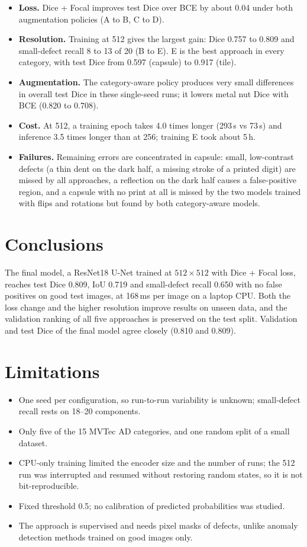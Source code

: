 \documentclass[10pt,a4paper]{article}
\begin{document}
\begin{itemize}
  \item \textbf{Loss.} Dice + Focal improves test Dice over BCE by about 0.04 under both augmentation policies (A to B, C to D).
  \item \textbf{Resolution.} Training at 512 gives the largest gain: Dice 0.757 to 0.809 and small-defect recall 8 to 13 of 20 (B to E). E is the best approach in every category, with test Dice from 0.597 (capsule) to 0.917 (tile).
  \item \textbf{Augmentation.} The category-aware policy produces very small differences in overall test Dice in these single-seed runs; it lowers metal nut Dice with BCE (0.820 to 0.708).
  \item \textbf{Cost.} At 512, a training epoch takes 4.0 times longer (293\,s vs 73\,s) and inference 3.5 times longer than at 256; training E took about 5\,h.
  \item \textbf{Failures.} Remaining errors are concentrated in capsule: small, low-contrast defects (a thin dent on the dark half, a missing stroke of a printed digit) are missed by all approaches, a reflection on the dark half causes a false-positive region, and a capsule with no print at all is missed by the two models trained with flips and rotations but found by both category-aware models.
\end{itemize}

\section{Conclusions}

The final model, a ResNet18 U-Net trained at $512\times512$ with Dice + Focal loss, reaches test Dice 0.809, IoU 0.719 and small-defect recall 0.650 with no false positives on good test images, at 168\,ms per image on a laptop CPU. Both the loss change and the higher resolution improve results on unseen data, and the validation ranking of all five approaches is preserved on the test split. Validation and test Dice of the final model agree closely (0.810 and 0.809).

\section{Limitations}

\begin{itemize}
  \item One seed per configuration, so run-to-run variability is unknown; small-defect recall rests on 18--20 components.
  \item Only five of the 15 MVTec AD categories, and one random split of a small dataset.
  \item CPU-only training limited the encoder size and the number of runs; the 512 run was interrupted and resumed without restoring random states, so it is not bit-reproducible.
  \item Fixed threshold 0.5; no calibration of predicted probabilities was studied.
  \item The approach is supervised and needs pixel masks of defects, unlike anomaly detection methods trained on good images only.
\end{itemize}
\end{document}
